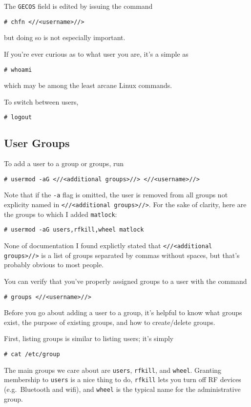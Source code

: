 \documentclass[12pt,letterpaper]{article}
\begin{document}
The \lstinline{GECOS} field is edited by issuing the command
\begin{lstlisting}
# chfn <//<username>//>
\end{lstlisting}
but doing so is not especially important.

If you're ever curious as to what user you are, it's a simple as
\begin{lstlisting}
# whoami
\end{lstlisting}
which may be among the least arcane Linux commands.

To switch between users,
\begin{lstlisting}
# logout
\end{lstlisting}

\subsection{User Groups}

To add a user to a group or groups, run
\begin{lstlisting}
# usermod -aG <//<additional groups>//> <//<username>//>
\end{lstlisting}
Note that if the \lstinline{-a} flag is omitted, the user is removed from all groups not explicity named in \lstinline{<//<additional groups>//>}.  For the sake of clarity, here are the groups to which I added \lstinline{matlock}:
\begin{lstlisting}
# usermod -aG users,rfkill,wheel matlock
\end{lstlisting}
None of documentation I found explictly stated that \lstinline{<//<additional groups>//>} is a list of groups separated by commas without spaces, but that's probably obvious to most people.

You can verify that you've properly assigned groups to a user with the command
\begin{lstlisting}
# groups <//<username>//>
\end{lstlisting}

Before you go about adding a user to a group, it's helpful to know what groups exist, the purpose of existing groups, and how to create/delete groups.

First, listing groups is similar to listing users; it's simply
\begin{lstlisting}
# cat /etc/group
\end{lstlisting}
The main groups we care about are \lstinline{users}, \lstinline{rfkill}, and \lstinline{wheel}.  Granting membership to \lstinline{users} is a nice thing to do, \lstinline{rfkill} lets you turn off RF devices (e.g.\ Bluetooth and wifi), and \lstinline{wheel} is the typical name for the administrative group.
\end{document}
